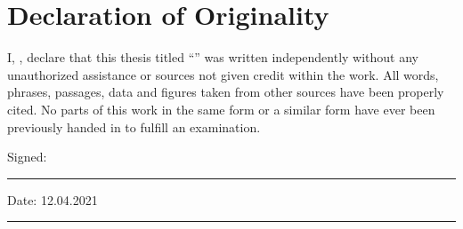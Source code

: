 \chapter{Declaration of Originality}

\noindent I, \authorname, declare that this thesis titled \enquote{\ttitle} was
written independently without any unauthorized assistance or sources not given
credit within the work. All words, phrases, passages, data and figures taken
from other sources have been properly cited. No parts of this work in the same
form or a similar form have ever been previously handed in to fulfill an
examination.

\vspace{40pt}

\noindent Signed:\\
\rule[0.5em]{25em}{0.5pt} %
 
\noindent Date: 12.04.2021 \\
\rule[0.5em]{25em}{0.5pt} %

\cleardoublepage

